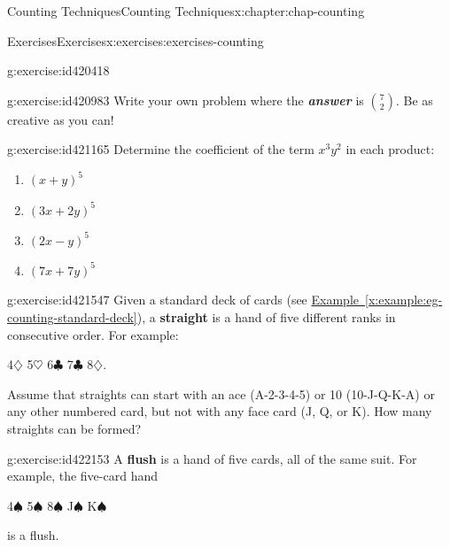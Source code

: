 \documentclass[oneside,10pt,]{book}
\newcommand{\xreffont}{\relax}
\newcommand{\alert}[1]{\textbf{\textit{#1}}}
\newcommand{\terminology}[1]{\textbf{#1}}
\numberwithin{equation}{section}
\begin{document}
\begin{chapterptx}{Counting Techniques}{}{Counting Techniques}{}{}{x:chapter:chap-counting}
\begin{exercises-section}{Exercises}{}{Exercises}{}{}{x:exercises:exercises-counting}
\begin{divisionexercise}{5}{}{}{g:exercise:id420418}
\end{divisionexercise}%
\begin{divisionexercise}{6}{}{}{g:exercise:id420983}%
Write your own problem where the \alert{answer} is \(\displaystyle\binom{7}{2}\). Be as creative as you can!%
\end{divisionexercise}%
\begin{divisionexercise}{7}{}{}{g:exercise:id421165}%
Determine the coefficient of the term \(x^3y^2\) in each product:%
\begin{enumerate}[label=(\alph*)]
\item{}\(\displaystyle (x+y)^5\)%
\item{}\(\displaystyle (3x+2y)^5\)%
\item{}\(\displaystyle (2x-y)^5\)%
\item{}\(\displaystyle (7x + 7y)^5\)%
\end{enumerate}
%
\end{divisionexercise}%
\begin{divisionexercise}{8}{}{}{g:exercise:id421547}%
Given a standard deck of cards (see \hyperref[x:example:eg-counting-standard-deck]{Example~{\xreffont\ref{x:example:eg-counting-standard-deck}}}), a \terminology{straight} is a hand of five different ranks in consecutive order. For example:%
\begin{sidebyside}{1}{0.3}{0.3}{0}%
\begin{sbspanel}{0.4}%
4\(\diamondsuit\) 5\(\heartsuit\) 6\(\clubsuit\) 7\(\clubsuit\) 8\(\diamondsuit\).%
\end{sbspanel}%
\end{sidebyside}%
\par
Assume that straights can start with an ace (A-2-3-4-5) or 10 (10-J-Q-K-A) or any other numbered card, but not with any face card (J, Q, or K). How many straights can be formed?%
\end{divisionexercise}%
\begin{divisionexercise}{9}{}{}{g:exercise:id422153}%
A \terminology{flush} is a hand of five cards, all of the same suit. For example, the five-card hand%
\begin{sidebyside}{1}{0.3}{0.3}{0}%
\begin{sbspanel}{0.4}%
4\(\spadesuit\) 5\(\spadesuit\) 8\(\spadesuit\) J\(\spadesuit\) K\(\spadesuit\)%
\end{sbspanel}%
\end{sidebyside}%
\par
is a flush.%
\par
%
\begin{enumerate}[label=(\alph*)]

\end{enumerate}
\end{divisionexercise}
\end{exercises-section}
\end{chapterptx}
\end{document}
